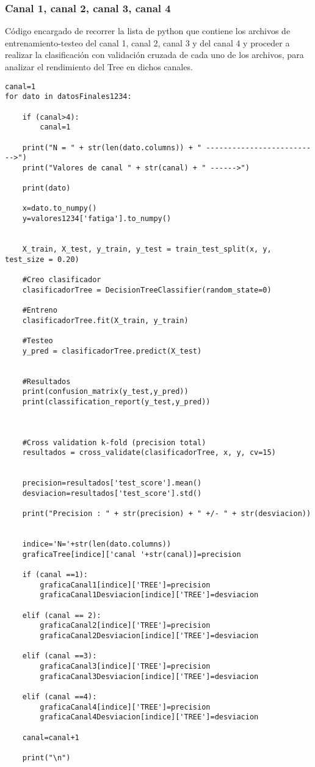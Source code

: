 \subsubsection{Canal 1, canal 2, canal 3, canal 4}
Código encargado de recorrer la lista de python que contiene los archivos de entrenamiento-testeo del canal 1, canal 2, canal 3 y del canal 4 y proceder a realizar la clasificación con validación cruzada de cada uno de los archivos, para analizar el rendimiento del Tree en dichos canales.

\begin{lstlisting}
canal=1
for dato in datosFinales1234:
    
    if (canal>4):
        canal=1
    
    print("N = " + str(len(dato.columns)) + " -------------------------->")
    print("Valores de canal " + str(canal) + " ------>")
    
    print(dato)
    
    x=dato.to_numpy()
    y=valores1234['fatiga'].to_numpy()
    
    
    X_train, X_test, y_train, y_test = train_test_split(x, y, test_size = 0.20)

    #Creo clasificador
    clasificadorTree = DecisionTreeClassifier(random_state=0)

    #Entreno
    clasificadorTree.fit(X_train, y_train)

    #Testeo 
    y_pred = clasificadorTree.predict(X_test)

    
    #Resultados
    print(confusion_matrix(y_test,y_pred))
    print(classification_report(y_test,y_pred))
    

    
    #Cross validation k-fold (precision total)
    resultados = cross_validate(clasificadorTree, x, y, cv=15)
    
    
    precision=resultados['test_score'].mean()
    desviacion=resultados['test_score'].std()
    
    print("Precision : " + str(precision) + " +/- " + str(desviacion))
    
    
    indice='N='+str(len(dato.columns))
    graficaTree[indice]['canal '+str(canal)]=precision
    
    if (canal ==1):
        graficaCanal1[indice]['TREE']=precision
        graficaCanal1Desviacion[indice]['TREE']=desviacion
        
    elif (canal == 2):
        graficaCanal2[indice]['TREE']=precision
        graficaCanal2Desviacion[indice]['TREE']=desviacion
        
    elif (canal ==3):
        graficaCanal3[indice]['TREE']=precision
        graficaCanal3Desviacion[indice]['TREE']=desviacion
        
    elif (canal ==4):
        graficaCanal4[indice]['TREE']=precision
        graficaCanal4Desviacion[indice]['TREE']=desviacion
        
    canal=canal+1
    
    print("\n")
    
\end{lstlisting}

